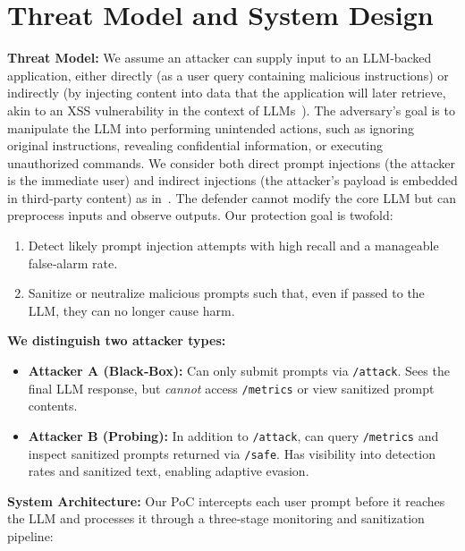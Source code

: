 \documentclass[conference]{IEEEtran}
\begin{document}
\section{Threat Model and System Design}
\label{sec:threat_model}

\textbf{Threat Model:} We assume an attacker can supply input to an LLM‐backed application, either directly (as a user query containing malicious instructions) or indirectly (by injecting content into data that the application will later retrieve, akin to an XSS vulnerability in the context of LLMs~\cite{Greshake2023}). The adversary’s goal is to manipulate the LLM into performing unintended actions, such as ignoring original instructions, revealing confidential information, or executing unauthorized commands. We consider both direct prompt injections (the attacker is the immediate user) and indirect injections (the attacker’s payload is embedded in third‐party content) as in~\cite{Greshake2023,Yi2023}. The defender cannot modify the core LLM but can preprocess inputs and observe outputs. Our protection goal is twofold:
\begin{enumerate}
  \item Detect likely prompt injection attempts with high recall and a manageable false‐alarm rate.
  \item Sanitize or neutralize malicious prompts such that, even if passed to the LLM, they can no longer cause harm.
\end{enumerate}

\medskip
\noindent\textbf{We distinguish two attacker types:}
\begin{itemize}
  \item \textbf{Attacker A (Black‐Box):} Can only submit prompts via \texttt{/attack}. Sees the final LLM response, but \emph{cannot} access \texttt{/metrics} or view sanitized prompt contents.
  \item \textbf{Attacker B (Probing):} In addition to \texttt{/attack}, can query \texttt{/metrics} and inspect sanitized prompts returned via \texttt{/safe}. Has visibility into detection rates and sanitized text, enabling adaptive evasion.
\end{itemize}

\medskip
\noindent\textbf{System Architecture:} Our PoC intercepts each user prompt before it reaches the LLM and processes it through a three‐stage monitoring and sanitization pipeline:
\end{document}

